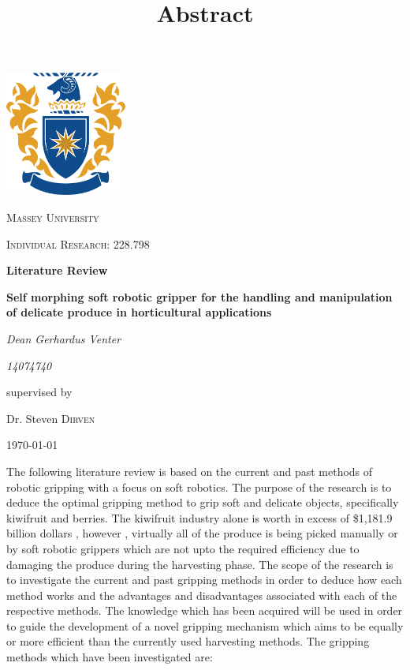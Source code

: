 \documentclass[11pt]{article}
\begin{document}
\begin{titlepage}
\centering
	\includegraphics[width=0.30\textwidth]{logo.png}\par\vspace{1cm}
	{\scshape\LARGE Massey University \par}
	\vspace{1cm}
	{\scshape\Large Individual Research: 228.798\par}
	\vspace{1.5cm}
	{\huge\bfseries Literature Review \par}
    \vspace{1cm}
    {\large\bfseries Self morphing soft robotic gripper for the handling and manipulation of delicate produce in horticultural applications\par}
	\vspace{2cm}
	{\large\itshape Dean Gerhardus Venter\par}
	\vspace{2cm}
	{\large\itshape 14074740\par}
	\vfill
	supervised by\par
	Dr. Steven  \textsc{Dirven}
   
	\vfill

	{\large \today \par}
\end{titlepage}
\title{Abstract}
\maketitle
\noindent
The following literature review is based on the current and past methods of robotic gripping with a focus on soft robotics. The purpose of the research is to deduce the optimal gripping method to grip soft and delicate objects, specifically kiwifruit and berries. The kiwifruit industry alone is worth in excess of \$1,181.9 billion dollars \cite{fresh_facts_2015}, however , virtually all of the produce is being picked manually or by soft robotic grippers which are not upto the required efficiency due to damaging the produce during the harvesting phase. The scope of the research is to investigate the current and past gripping methods in order to deduce how each method works and the advantages and disadvantages associated with each of the respective methods. The knowledge which has been acquired will be used in order to guide the development of a novel gripping mechanism which aims to be equally or more efficient than the currently used harvesting methods. The gripping methods which have been investigated are:
\end{document}
